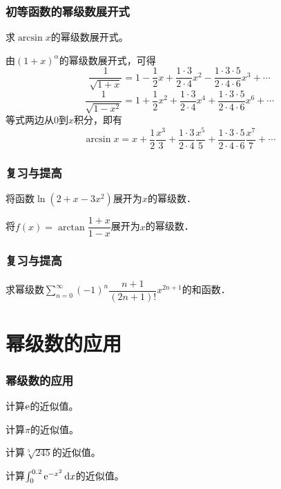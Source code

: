 \documentclass[14pt,notheorems,leqno,xcolor={rgb}]{beamer} %
\begin{document}
\begin{iframe}
\frametitle{初等函数的幂级数展开式}
\begin{example}
求$\arcsin x$的幂级数展开式。
\end{example}
\pause
\begin{solution}
由$(1+x)^\alpha$的幂级数展开式，可得
\[\frac1{\sqrt{1+x}}=1-\frac12x+\frac{1\cdot3}{2\cdot4}x^2-\frac{1\cdot3\cdot5}{2\cdot4\cdot6}x^3+\cdots\]
\pause
\[\frac1{\sqrt{1-x^2}}=1+\frac12x^2+\frac{1\cdot3}{2\cdot4}x^4+\frac{1\cdot3\cdot5}{2\cdot4\cdot6}x^6+\cdots\]
\pause
等式两边从$0$到$x$积分，即有
\[\arcsin x=x+\frac12\frac{x^3}3+\frac{1\cdot3}{2\cdot4}\frac{x^5}5
             +\frac{1\cdot3\cdot5}{2\cdot4\cdot6}\frac{x^7}7+\cdots\]
\end{solution}
\end{iframe}


\begin{frame}
\frametitle{复习与提高}
\begin{puzzle}
将函数$\ln(2+x-3x^2)$展开为$x$的幂级数．
\end{puzzle}
\vpause
\begin{puzzle}
将$f(x)=\arctan\dfrac{1+x}{1-x}$展开为$x$的幂级数．
\end{puzzle}
\end{frame}

\begin{frame}
\frametitle{复习与提高}
\begin{puzzle}
求幂级数$\sum\limits_{n=0}^{\infty}(-1)^n\dfrac{n+1}{(2n+1)!}x^{2n+1}$的和函数．
\end{puzzle}
\end{frame}

\section{幂级数的应用}

\begin{frame}
\frametitle{幂级数的应用}
\begin{example}
计算$\mathrm{e}$的近似值。
\end{example}
\vpause
\begin{example}
计算$\pi$的近似值。
\end{example}
\vpause
\begin{example}
计算$\sqrt[5]{245}$的近似值。
\end{example}
\vpause
\begin{example}
计算$\int_0^{0.2}\mathrm{e}^{-x^2}\mathop{}\!\mathrm{d} x$的近似值。
\end{example}
\end{frame}
\end{document}
